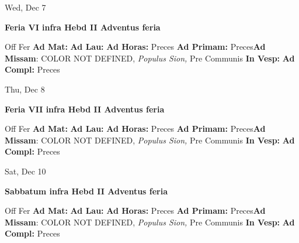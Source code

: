 \documentclass[10pt]{memoir}
\begin{document}
\begin{center}
\begin{minipage}{3.5in}
\vspace{2em}
\begin{center}Wed, Dec 7
\end{center}
\textbf{ \large Feria VI infra Hebd II Adventus
\textnormal{\normalsize feria}}

\begin{justify}Off Fer
\textbf{Ad Mat: }
\textbf{Ad Lau: }
\textbf{Ad Horas: }Preces
\textbf{Ad Primam: }Preces\textbf{Ad Missam}: COLOR NOT DEFINED, \textit{Populus Sion,} Pre Communis
\textbf{In Vesp: }
\textbf{Ad Compl: }Preces
\end{justify}
\end{minipage}
\end{center}

\begin{center}
\begin{minipage}{3.5in}
\vspace{2em}
\begin{center}Thu, Dec 8
\end{center}
\textbf{ \large Feria VII infra Hebd II Adventus
\textnormal{\normalsize feria}}

\begin{justify}Off Fer
\textbf{Ad Mat: }
\textbf{Ad Lau: }
\textbf{Ad Horas: }Preces
\textbf{Ad Primam: }Preces\textbf{Ad Missam}: COLOR NOT DEFINED, \textit{Populus Sion,} Pre Communis
\textbf{In Vesp: }
\textbf{Ad Compl: }Preces
\end{justify}
\end{minipage}
\end{center}

\begin{center}
\begin{minipage}{3.5in}
\vspace{2em}
\begin{center}Sat, Dec 10
\end{center}
\textbf{ \large Sabbatum infra Hebd II Adventus
\textnormal{\normalsize feria}}

\begin{justify}Off Fer
\textbf{Ad Mat: }
\textbf{Ad Lau: }
\textbf{Ad Horas: }Preces
\textbf{Ad Primam: }Preces\textbf{Ad Missam}: COLOR NOT DEFINED, \textit{Populus Sion,} Pre Communis
\textbf{In Vesp: }
\textbf{Ad Compl: }Preces
\end{justify}
\end{minipage}
\end{center}
\end{document}
